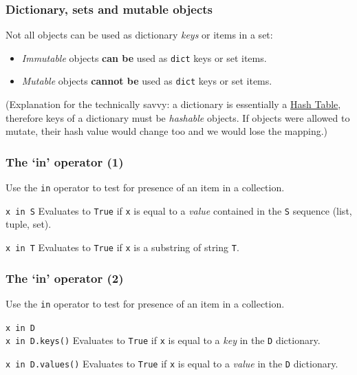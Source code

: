 \documentclass[english,serif,mathserif,xcolor=pdftex,dvipsnames,table]{beamer}
\begin{document}
\begin{frame}[fragile]
  \frametitle{Dictionary, sets and mutable objects}

  Not all objects can be used as dictionary \emph{keys} or items in a
  set:
  \begin{itemize}
    \item
      \textit{Immutable} objects \textbf{can be} used as \texttt{dict} keys or set items.
    \item
      \textit{Mutable} objects  \textbf{cannot be} used as \texttt{dict} keys or set items.
    \end{itemize}

    \+
    {\footnotesize
      (Explanation for the technically savvy: a dictionary is
      essentially a \href{http://en.wikipedia.org/wiki/Hash_table}{Hash
        Table}, therefore keys of a dictionary must be \textit{hashable}
      objects.  If objects were allowed to mutate, their hash value
      would change too and we would lose the mapping.)}
\end{frame}


\begin{frame}[fragile]
  \frametitle{The `{\ttfamily\bfseries in}' operator (1)}

  Use the \lstinline|in| operator to test for presence of an item in a
  collection.

  \begin{describe}{\lstinline|x in S|}
    Evaluates to \texttt{True} if \lstinline|x| is equal to a \emph{value}
    contained in the \lstinline|S| sequence (list, tuple, set).
  \end{describe}

  \begin{describe}{\lstinline|x in T|}
    Evaluates to \texttt{True} if \lstinline|x| is a substring of
    string \lstinline|T|.
  \end{describe}

\end{frame}


\begin{frame}[fragile]
  \frametitle{The `{\ttfamily\bfseries in}' operator (2)}

  Use the \lstinline|in| operator to test for presence of an item in a
  collection.

  \begin{describe}{\lstinline|x in D| \\ \lstinline|x in D.keys()|}
    Evaluates to \texttt{True} if \lstinline|x| is equal to a \emph{key}
    in the \lstinline|D| dictionary.
  \end{describe}

  \begin{describe}{\lstinline|x in D.values()|}
    Evaluates to \texttt{True} if \lstinline|x| is equal to a \emph{value}
    in the \lstinline|D| dictionary.
  \end{describe}

\end{frame}
\end{document}
